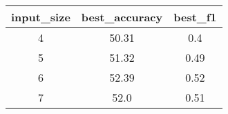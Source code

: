 \begin{tabular}{ccc}
	input\_size & best\_accuracy & best\_f1 \\\hline\hline
	4           & 50.31          & 0.4      \\
	5           & 51.32          & 0.49     \\
	6           & 52.39          & 0.52     \\
	7           & 52.0           & 0.51     \\
\end{tabular}